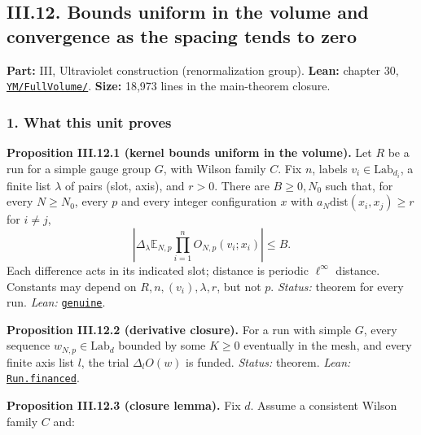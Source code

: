 \documentclass[
  letterpaper,
  11pt]{article}
\begin{document}
\subsection{III.12. Bounds uniform in the volume and convergence as the
spacing tends to
zero}\label{iii.12.-bounds-uniform-in-the-volume-and-convergence-as-the-spacing-tends-to-zero}

\textbf{Part:} III, Ultraviolet construction (renormalization group).
\textbf{Lean:} chapter 30,
\href{https://github.com/yang-mills-group/OpenAI-YM-20261028/tree/3456e5e75cf8d4cd558955a5c7638fba2d68f464/YM/FullVolume}{\texttt{YM/FullVolume/}}.
\textbf{Size:} 18,973 lines in the main-theorem closure.

\subsubsection{1. What this unit proves}\label{what-this-unit-proves-14}

\textbf{Proposition III.12.1 (kernel bounds uniform in the volume).} Let
\(R\) be a run for a simple gauge group \(G\), with Wilson family \(C\).
Fix \(n\), labels \(v_i\in\mathrm{Lab}_{d_i}\), a finite list
\(\lambda\) of pairs (slot, axis), and \(r>0\). There are \(B\ge0,N_0\)
such that, for every \(N\ge N_0\), every \(p\) and every integer
configuration \(x\) with \(a_N\mathrm{dist}(x_i,x_j)\ge r\) for
\(i\ne j\),
\[\left|\Delta_\lambda\mathbb E_{N,p}\prod_{i=1}^nO_{N,p}(v_i;x_i)\right|\le B.\]
Each difference acts in its indicated slot; distance is periodic
\(\ell^\infty\) distance. Constants may depend on
\(R,n,(v_i),\lambda,r\), but not \(p\). \emph{Status:} theorem for every
run. \emph{Lean:}
\href{https://github.com/yang-mills-group/OpenAI-YM-20261028/blob/3456e5e75cf8d4cd558955a5c7638fba2d68f464/YM/FullVolume/Literal.lean\#L62}{\texttt{genuine}}.

\textbf{Proposition III.12.2 (derivative closure).} For a run with
simple \(G\), every sequence \(w_{N,p}\in\mathrm{Lab}_d\) bounded by
some \(K\ge0\) eventually in the mesh, and every finite axis list \(l\),
the trial \(\Delta_lO(w)\) is funded. \emph{Status:} theorem.
\emph{Lean:}
\href{https://github.com/yang-mills-group/OpenAI-YM-20261028/blob/3456e5e75cf8d4cd558955a5c7638fba2d68f464/YM/FullVolume/Literal.lean\#L24-L33}{\texttt{Run.financed}}.

\textbf{Proposition III.12.3 (closure lemma).} Fix \(d\). Assume a
consistent Wilson family \(C\) and:
\end{document}
